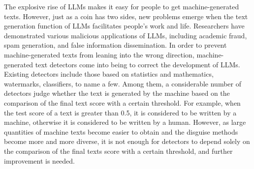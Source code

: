 \documentclass[11pt]{article}
\newcommand{\greenCitep}[1]{\textcolor{darkgreen}{\citep{#1}}}
\begin{document}
	The explosive rise of LLMs\greenCitep{Claude2024,deepseekai2025,geminiteam2024geminifamilyhighlycapable} makes it easy for people to get machine-generated texts. However, just as a coin has two sides, new problems emerge when the text generation function of LLMs facilitates people's work and life. Researchers have demonstrated various malicious applications of LLMs, including academic fraud\greenCitep{Perkins2023}, spam generation, and false information dissemination\greenCitep{hazell2023spear,Weidinger2022taxonomy}. In order to prevent machine-generated texts from leaning into the wrong direction, machine-generated text detectors come into being to correct the development of LLMs. Existing detectors include those based on statistics and mathematics\greenCitep{mitchell2023detectgpt,tian2023gptzero}, watermarks\greenCitep{gu2022watermarking,kirchenbauer2023watermark}, classifiers\greenCitep{guo2023simpleai,wang2023seqxgpt}, to name a few. Among them, a considerable number of detectors judge whether the text is generated by the machine based on the comparison of the final text score with a certain threshold. For example, when the test score of a text is greater than 0.5, it is considered to be written by a machine, otherwise it is considered to be written by a human. However, as large quantities of machine texts become easier to obtain and the disguise methods become more and more diverse\greenCitep{zhou2024navigatingshadows,huang2024ai}, it is not enough for detectors to depend solely on the comparison of the final texts score with a certain threshold, and further improvement is needed.
\end{document}
